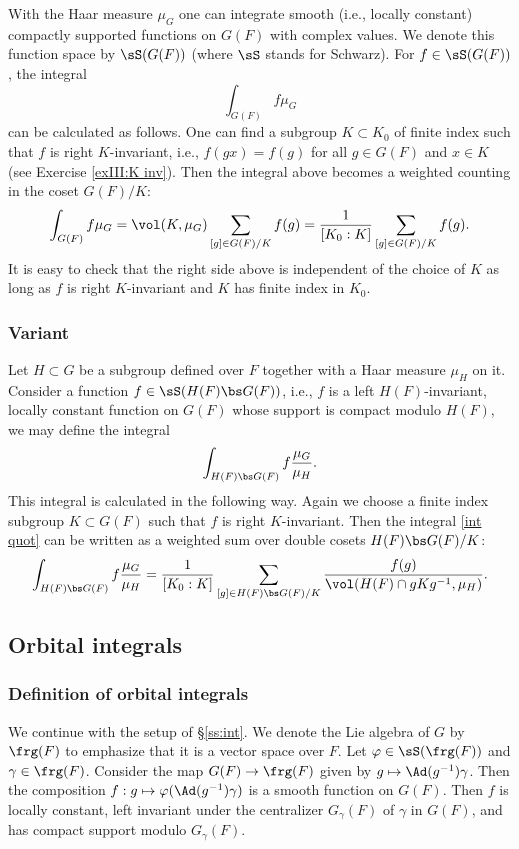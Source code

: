 With the Haar measure $\mu_{G}$ one can integrate smooth (i.e., locally constant) compactly supported functions on $G(F)$ with complex values. We denote this function space by $\sS(G(F))$ (where $\sS$ stands for Schwarz). For $f\in\sS(G(F))$, the integral
\begin{equation*}
\int_{G(F)}f\mu_{G}
\end{equation*} 
can be calculated as follows. One can find a subgroup $K\subset K_{0}$ of finite index such that $f$ is right $K$-invariant, i.e., $f(gx)=f(g)$ for all $g\in G(F)$ and $x\in K$ (see Exercise \ref{exIII:K inv}). Then the integral above becomes a weighted counting in the coset $G(F)/K$:
\begin{equation*}
\int_{G(F)}f\mu_{G}=\vol(K,\mu_{G})\sum_{[g]\in G(F)/K}f(g)=\frac{1}{[K_{0}:K]}\sum_{[g]\in G(F)/K}f(g).
\end{equation*}
It is easy to check that the right side above  is independent of the choice of $K$ as long as $f$ is right $K$-invariant and $K$ has finite index in $K_{0}$.

\subsubsection{Variant} Let $H\subset G$ be a subgroup defined over $F$ together with a Haar measure $\mu_{H}$ on it. Consider a function $f\in\sS(H(F)\bs G(F))$, i.e., $f$ is a left $H(F)$-invariant, locally constant function on $G(F)$ whose support is compact modulo $H(F)$, we may define the integral
\begin{equation}\label{int quot}
\int_{H(F)\bs G(F)}f\frac{\mu_{G}}{\mu_{H}}.
\end{equation} 
This integral is calculated in the following way. Again we choose a finite index subgroup $K\subset G(F)$ such that $f$ is right $K$-invariant. Then the integral \eqref{int quot} can be written as a weighted sum over double cosets $H(F)\bs G(F)/K$:
\begin{equation*}
\int_{H(F)\bs G(F)}f\frac{\mu_{G}}{\mu_{H}}=\frac{1}{[K_{0}:K]}\sum_{[g]\in H(F)\bs G(F)/K}\frac{f(g)}{\vol(H(F)\cap gKg^{-1}, \mu_{H})}.
\end{equation*}

\subsection{Orbital integrals} 

\subsubsection{Definition of orbital integrals} We continue with the setup of \S\ref{ss:int}. We denote the Lie algebra of $G$ by $\frg(F)$ to emphasize that it is a vector space over $F$. Let $\varphi\in\sS(\frg(F))$ and $\gamma\in\frg(F)$. Consider the map $G(F)\to \frg(F)$ given by $g\mapsto \Ad(g^{-1})\gamma$. Then the composition $f: g\mapsto \varphi(\Ad(g^{-1})\gamma)$ is a smooth function on $G(F)$.  Then $f$ is locally constant, left invariant under the centralizer $G_{\gamma}(F)$ of $\gamma$ in $G(F)$, and has compact support modulo $G_{\gamma}(F)$. 

